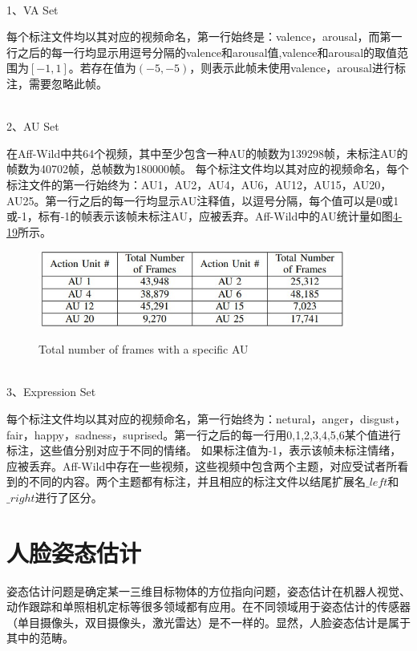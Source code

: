 \quad \\

1、VA Set

每个标注文件均以其对应的视频命名，第一行始终是：valence，arousal，而第一行之后的每一行均显示用逗号分隔的valence和arousal值,valence和arousal的取值范围为$[-1,1]$。若存在值为$(-5,-5)$，则表示此帧未使用valence，arousal进行标注，需要忽略此帧。

\quad \\

2、AU Set

在Aff-Wild中共64个视频，其中至少包含一种AU的帧数为139298帧，未标注AU的帧数为40702帧，总帧数为180000帧。 每个标注文件均以其对应的视频命名，每个标注文件的第一行始终为：AU1，AU2，AU4，AU6，AU12，AU15，AU20，AU25。第一行之后的每一行均显示AU注释值，以逗号分隔，每个值可以是0或1或-1，标有-1的帧表示该帧未标注AU，应被丢弃。Aff-Wild中的AU统计量如图\href{fig:4-19}{4-19}所示。
\begin{figure}
  \centering
  \includegraphics[width=4in]{figure/example/Aff-Wild2.jpg}\\
  \caption{Total number of frames with a specific AU}
  \label{fig:4-19}
\end{figure}

\quad \\

3、Expression Set

每个标注文件均以其对应的视频命名，第一行始终为：netural，anger，disgust，fair，happy，sadness，suprised。第一行之后的每一行用{0,1,2,3,4,5,6}某个值进行标注，这些值分别对应于不同的情绪。 如果标注值为-1，表示该帧未标注情绪，应被丢弃。Aff-Wild中存在一些视频，这些视频中包含两个主题，对应受试者所看到的不同的内容。两个主题都有标注，并且相应的标注文件以结尾扩展名$\_left$和$\_right$进行了区分。

\section{人脸姿态估计}

姿态估计问题是确定某一三维目标物体的方位指向问题，姿态估计在机器人视觉、动作跟踪和单照相机定标等很多领域都有应用。在不同领域用于姿态估计的传感器（单目摄像头，双目摄像头，激光雷达）是不一样的。显然，人脸姿态估计是属于其中的范畴。

